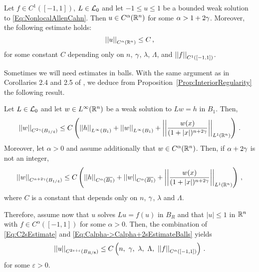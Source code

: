 \begin{corollary}
\label{Cor:C2regularity}
Let $f\in C^{1}([-1,1])$, $L\in \mathcal{L}_0$ and let $-1 \leq u \leq 1$ be a bounded weak solution to \eqref{Eq:NonlocalAllenCahn}. Then $u\in C^{\alpha}(\mathbb{R}^n)$ for some $\alpha > 1+ 2 \gamma$. Moreover, the following estimate holds:
\begin{equation}
	\left | \left |{u} \right | \right |_{C^{\alpha}(\mathbb{R}^n)} \leq C\,,
\end{equation}
for some constant $C$ depending only on $n$, $\gamma$, $\lambda$, $\Lambda$, and $\left | \left |{f} \right | \right |_{C^1([-1,1])}$.
\end{corollary}


Sometimes we will need estimates in balls. With the same argument as in Corollaries 2.4 and 2.5 of \cite{RosOtonSerra-Regularity}, we deduce from Proposition~\ref{Prop:InteriorRegularity} the following result.

\begin{corollary}
\label{Cor:InteriorRegularityBalls}
Let $L\in\mathcal{L}_0$ and let $w\in L^\infty (\mathbb{R}^n)$ be a weak solution to $Lw = h$ in $B_1$. Then,
\begin{equation}
\label{Eq:C2sEstimateBalls}
\left | \left |{w} \right | \right |_{C^{2\gamma} (B_{1/4})} \leq C\left ( {\left | \left |{h} \right | \right |_{L^\infty (B_1)} + \left | \left |{w} \right | \right |_{L^\infty  (B_1)} + \left | \left |{\dfrac{w(x)}{(1+|x|)^{n+2\gamma}}} \right | \right |_{L^1(\mathbb{R}^n)} }\right )\,.
\end{equation}
Moreover, let $\alpha > 0$ and assume additionally that $w \in C^\alpha (\mathbb{R}^n)$. Then, if $\alpha + 2\gamma$ is not an integer,
\begin{equation}
\label{Eq:Calpha->Calpha+2sEstimateBalls}
\left | \left |{w} \right | \right |_{C^{\alpha + 2\gamma} (B_{1/4})} \leq C\left ( {\left | \left |{h} \right | \right |_{C^{\alpha} (\overline{B_1})} + \left | \left |{w} \right | \right |_{C^\alpha (\overline{B_1})} + \left | \left |{\dfrac{w(x)}{(1+|x|)^{n+2\gamma}}} \right | \right |_{L^1(\mathbb{R}^n)} }\right )\,,
\end{equation}
where $C$ is a constant that depends only on $n$, $\gamma$, $\lambda$ and $\Lambda$.
\end{corollary}

Therefore, assume now that $u$ solves $Lu = f(u)$ in $B_R$ and that $|u|\leq 1$ in $\mathbb{R}^n$ with $f\in C^{\alpha}([-1,1])$ for some $\alpha > 0$. Then, the combination of \eqref{Eq:C2sEstimate} and \eqref{Eq:Calpha->Calpha+2sEstimateBalls} yields
\begin{equation}
\label{Eq:UniformC2alphaEstimateBalls}
\norm{u}_{C^{2s + \varepsilon}(B_{R/8})} \leq C \bpar{n,\ \s ,\ \lambda,\ \Lambda ,\ \norm{f}_{C^{\alpha}([-1,1])} }\,.
\end{equation}
for some $\varepsilon > 0$.

